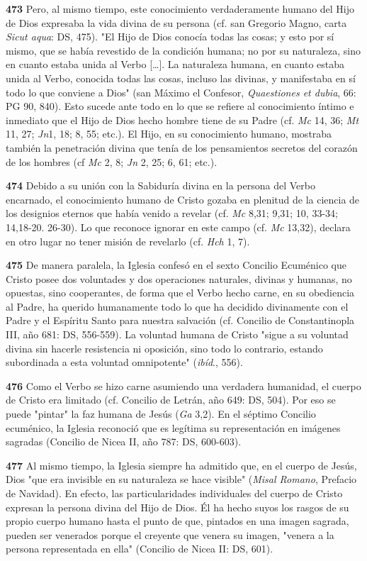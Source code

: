 \documentclass[]{article}
\begin{document}
\textbf{473} Pero, al mismo tiempo, este conocimiento verdaderamente
humano del Hijo de Dios expresaba la vida divina de su persona (cf. san
Gregorio Magno, carta \emph{Sicut aqua}: DS, 475). "El Hijo de Dios
conocía todas las cosas; y esto por sí mismo, que se había revestido de
la condición humana; no por su naturaleza, sino en cuanto estaba unida
al Verbo [\ldots{}]. La naturaleza humana, en cuanto estaba unida al
Verbo, conocida todas las cosas, incluso las divinas, y manifestaba en
sí todo lo que conviene a Dios" (san Máximo el Confesor,
\emph{Quaestiones et dubia}, 66: PG 90, 840). Esto sucede ante todo en
lo que se refiere al conocimiento íntimo e inmediato que el Hijo de Dios
hecho hombre tiene de su Padre (cf. \emph{Mc} 14, 36; \emph{Mt} 11, 27;
\emph{Jn}1, 18; 8, 55; etc.). El Hijo, en su conocimiento humano,
mostraba también la penetración divina que tenía de los pensamientos
secretos del corazón de los hombres (cf \emph{Mc} 2, 8; \emph{Jn} 2, 25;
6, 61; etc.).

\textbf{474} Debido a su unión con la Sabiduría divina en la persona del
Verbo encarnado, el conocimiento humano de Cristo gozaba en plenitud de
la ciencia de los designios eternos que había venido a revelar (cf.
\emph{Mc} 8,31; 9,31; 10, 33-34; 14,18-20. 26-30). Lo que reconoce
ignorar en este campo (cf. \emph{Mc} 13,32), declara en otro lugar no
tener misión de revelarlo (cf. \emph{Hch} 1, 7).

\textbf{475} De manera paralela, la Iglesia confesó en el sexto Concilio
Ecuménico que Cristo posee dos voluntades y dos operaciones naturales,
divinas y humanas, no opuestas, sino cooperantes, de forma que el Verbo
hecho carne, en su obediencia al Padre, ha querido humanamente todo lo
que ha decidido divinamente con el Padre y el Espíritu Santo para
nuestra salvación (cf. Concilio de Constantinopla III, año 681: DS,
556-559). La voluntad humana de Cristo "sigue a su voluntad divina sin
hacerle resistencia ni oposición, sino todo lo contrario, estando
subordinada a esta voluntad omnipotente" (\emph{ibíd}., 556).

\textbf{476} Como el Verbo se hizo carne asumiendo una verdadera
humanidad, el cuerpo de Cristo era limitado (cf. Concilio de Letrán, año
649: DS, 504). Por eso se puede "pintar" la faz humana de Jesús
(\emph{Ga} 3,2). En el séptimo Concilio ecuménico, la Iglesia reconoció
que es legítima su representación en imágenes sagradas (Concilio de
Nicea II, año 787: DS, 600-603).

\textbf{477} Al mismo tiempo, la Iglesia siempre ha admitido que, en el
cuerpo de Jesús, Dios "que era invisible en su naturaleza se hace
visible" (\emph{Misal Romano}, Prefacio de Navidad). En efecto, las
particularidades individuales del cuerpo de Cristo expresan la persona
divina del Hijo de Dios. Él ha hecho suyos los rasgos de su propio
cuerpo humano hasta el punto de que, pintados en una imagen sagrada,
pueden ser venerados porque el creyente que venera su imagen, "venera a
la persona representada en ella" (Concilio de Nicea II: DS, 601).
\end{document}
